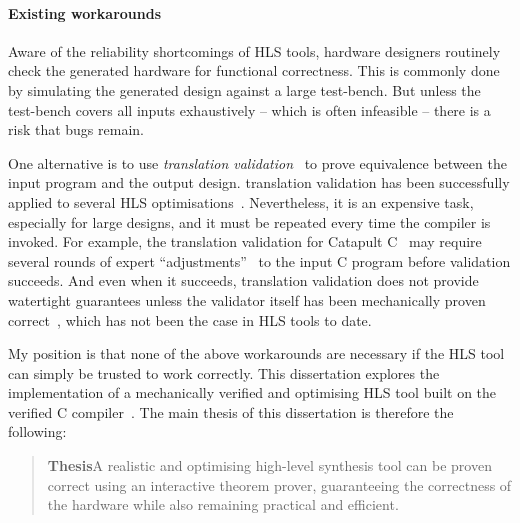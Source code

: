 \paragraph{Existing workarounds}

Aware of the reliability shortcomings of \gls{HLS} tools, hardware designers
routinely check the generated hardware for functional correctness.  This is
commonly done by simulating the generated design against a large test-bench.
But unless the test-bench covers all inputs exhaustively -- which is often
infeasible -- there is a risk that bugs remain.

One alternative is to use \emph{\gls{translation
    validation}}~\cite{pnueli98_trans} to prove equivalence between the input
program and the output design. \Gls{translation validation} has been
successfully applied to several \gls{HLS} optimisations~\cite{kim04_autom_fsmd,
  karfa06_formal_verif_method_sched_high_synth,
  chouksey20_verif_sched_condit_behav_high_level_synth,
  banerjee14_verif_code_motion_techn_using_value_propag,
  chouksey19_trans_valid_code_motion_trans_invol_loops}.  Nevertheless, it is an
expensive task, especially for large designs, and it must be repeated every time
the compiler is invoked.  For example, the translation validation for Catapult
C~\cite{mentor20_catap_high_level_synth} may require several rounds of expert
\enquote{adjustments}~\cite[p.~3]{chauhan20_formal_ensur_equiv_c_rtl} to the
input C program before validation succeeds. And even when it succeeds,
translation validation does not provide watertight guarantees unless the
validator itself has been mechanically proven
correct~\cite[e.g.][]{tristan08_formal_verif_trans_valid}, which has not been
the case in \gls{HLS} tools to date.

My position is that none of the above workarounds are necessary if the \gls{HLS}
tool can simply be trusted to work correctly.  This dissertation explores the
implementation of a mechanically verified and optimising \gls{HLS} tool built on
the \compcert{} verified C compiler~\cite{leroy06_formal_certif_compil_back_end,
  leroy09_formal_verif_realis_compil, leroy16_cfvoc}.  The main thesis of this
dissertation is therefore the following:

\begin{samepage}
  \begin{quote}
    \textbf{Thesis}\quad A realistic and optimising high-level synthesis tool
    can be proven correct using an interactive theorem prover, guaranteeing the
    correctness of the hardware while also remaining practical and efficient.
  \end{quote}
\end{samepage}

